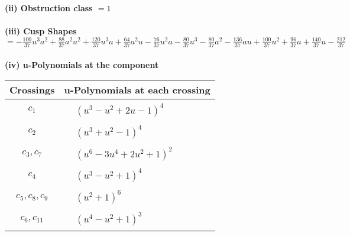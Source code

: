 \documentclass[1p]{elsarticle_modified}
\theoremstyle{definition}
\begin{document}
\flushleft \textbf{(ii) Obstruction class $= 1$}\\~\\
\flushleft \textbf{(iii) Cusp Shapes $= -\frac{100}{37} u^3 a^2+\frac{88}{37} a^2 u^2+\frac{120}{37} u^3 a+\frac{64}{37} a^2 u-\frac{76}{37} u^2 a-\frac{80}{37} u^3-\frac{80}{37} a^2-\frac{136}{37} a u+\frac{100}{37} u^2+\frac{96}{37} a+\frac{140}{37} u-\frac{212}{37}$}\\~\\
\newpage\renewcommand{\arraystretch}{1}
\flushleft \textbf{(iv) u-Polynomials at the component}\newline \\
\begin{tabular}{m{50pt}|m{274pt}}
Crossings & \hspace{64pt}u-Polynomials at each crossing \\
\hline $$\begin{aligned}c_{1}\end{aligned}$$&$\begin{aligned}
&(u^3- u^2+2 u-1)^4
\end{aligned}$\\
\hline $$\begin{aligned}c_{2}\end{aligned}$$&$\begin{aligned}
&(u^3+u^2-1)^4
\end{aligned}$\\
\hline $$\begin{aligned}c_{3},c_{7}\end{aligned}$$&$\begin{aligned}
&(u^6-3 u^4+2 u^2+1)^2
\end{aligned}$\\
\hline $$\begin{aligned}c_{4}\end{aligned}$$&$\begin{aligned}
&(u^3- u^2+1)^4
\end{aligned}$\\
\hline $$\begin{aligned}c_{5},c_{8},c_{9}\end{aligned}$$&$\begin{aligned}
&(u^2+1)^6
\end{aligned}$\\
\hline $$\begin{aligned}c_{6},c_{11}\end{aligned}$$&$\begin{aligned}
&(u^4- u^2+1)^3
\end{aligned}$\\

\end{tabular}
\end{document}

